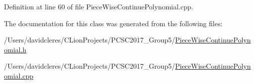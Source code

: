 Definition at line 60 of file Piece\+Wise\+Continue\+Polynomial.\+cpp.



The documentation for this class was generated from the following files\+:\begin{DoxyCompactItemize}
\item 
/\+Users/davidcleres/\+C\+Lion\+Projects/\+P\+C\+S\+C2017\+\_\+\+Group5/\mbox{\hyperlink{_piece_wise_continue_polynomial_8h}{Piece\+Wise\+Continue\+Polynomial.\+h}}\item 
/\+Users/davidcleres/\+C\+Lion\+Projects/\+P\+C\+S\+C2017\+\_\+\+Group5/\mbox{\hyperlink{_piece_wise_continue_polynomial_8cpp}{Piece\+Wise\+Continue\+Polynomial.\+cpp}}\end{DoxyCompactItemize}
